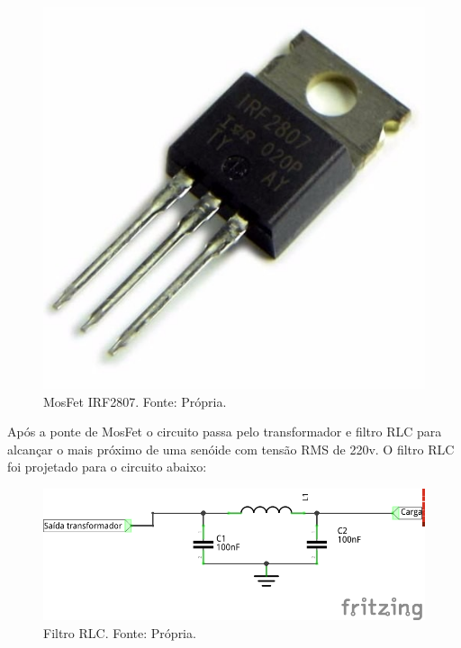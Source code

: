                 \begin{figure}[!htb]
            		\centering
            		\includegraphics[scale= 0.2]{figuras/IRF2807.jpg}
            		\caption{MosFet IRF2807. Fonte: Própria.}
            		\label{mosfet}
            	\end{figure}            						
				
				Após a ponte de MosFet o circuito passa pelo transformador e filtro RLC para 					alcançar o mais próximo de uma senóide com tensão RMS de 220v. O filtro RLC 					foi projetado para o circuito abaixo:	

                \begin{figure}[!htb]
            		\centering
            		\includegraphics[scale= 1.0]{figuras/Filtro_RLC.png}
            		\caption{Filtro RLC. Fonte: Própria.}
            		\label{rlc}
            	\end{figure}  				
				
